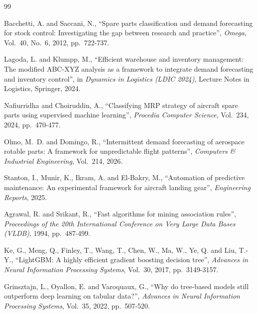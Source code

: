 \documentclass[12pt,oneside]{report}
\begin{document}
\begin{singlespace}
\renewcommand{\bibname}{References}
\begin{thebibliography}{99}

 Bacchetti, A. and Saccani, N., ``Spare parts classification and demand forecasting for stock control: Investigating the gap between research and practice'', \emph{Omega}, Vol.~40, No.~6, 2012, pp.~722-737.

 Lagoda, L. and Klumpp, M., ``Efficient warehouse and inventory management: The modified ABC-XYZ analysis as a framework to integrate demand forecasting and inventory control'', in \emph{Dynamics in Logistics (LDIC 2024)}, Lecture Notes in Logistics, Springer, 2024.

 Nafiurridha and Choiruddin, A., ``Classifying MRP strategy of aircraft spare parts using supervised machine learning'', \emph{Procedia Computer Science}, Vol.~234, 2024, pp.~470-477.

 Olmo, M.~D. and Domingo, R., ``Intermittent demand forecasting of aerospace rotable parts: A framework for unpredictable flight patterns'', \emph{Computers \& Industrial Engineering}, Vol.~214, 2026.

 Stanton, I., Munir, K., Ikram, A. and El-Bakry, M., ``Automation of predictive maintenance: An experimental framework for aircraft landing gear'', \emph{Engineering Reports}, 2025.

 Agrawal, R. and Srikant, R., ``Fast algorithms for mining association rules'', \emph{Proceedings of the 20th International Conference on Very Large Data Bases (VLDB)}, 1994, pp.~487-499.

 Ke, G., Meng, Q., Finley, T., Wang, T., Chen, W., Ma, W., Ye, Q. and Liu, T.-Y., ``LightGBM: A highly efficient gradient boosting decision tree'', \emph{Advances in Neural Information Processing Systems}, Vol.~30, 2017, pp.~3149-3157.

 Grinsztajn, L., Oyallon, E. and Varoquaux, G., ``Why do tree-based models still outperform deep learning on tabular data?'', \emph{Advances in Neural Information Processing Systems}, Vol.~35, 2022, pp.~507-520.


\end{thebibliography}
\end{singlespace}
\end{document}
